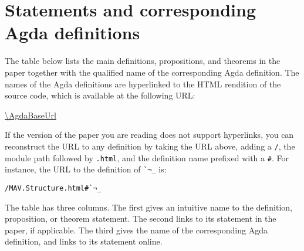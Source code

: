 \section{Statements and corresponding Agda definitions}
\label{sec:table-of-statments}

The table below lists the main definitions, propositions, and theorems in the paper together with the qualified name of the corresponding Agda definition.
The names of the Agda definitions are hyperlinked to the HTML rendition of the source code, which is available at the following URL:
\begin{center}
  \url{\AgdaBaseUrl}
\end{center}
If the version of the paper you are reading does not support hyperlinks, you can reconstruct the URL to any definition by taking the URL above, adding a \texttt{/}, the module path followed by \texttt{.html}, and the definition name prefixed with a \texttt{\#}.
For instance, the URL to the definition of \texttt{\`{}¬\_} is:
\begin{center}
  \texttt{\AgdaBaseUrl/MAV.Structure.html\#\`{}¬\_}
\end{center}
The table has three columns.
The first gives an intuitive name to the definition, proposition, or theorem statement.
The second links to its statement in the paper, if applicable.
The third gives the name of the corresponding Agda definition, and links to its statement online.
\vspace*{2ex}
